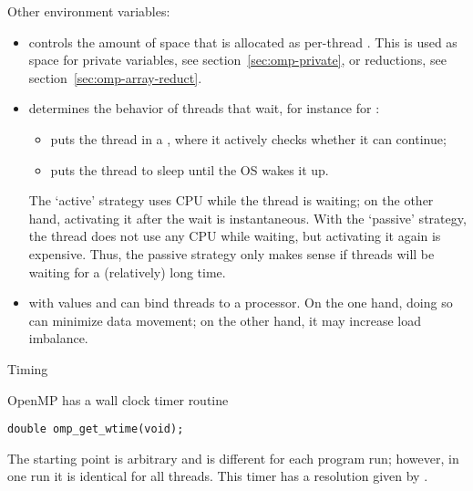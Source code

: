Other environment variables:
\begin{itemize}
\item {} controls the amount of space that is
  allocated as per-thread .
  This is used as space for private variables, see section~\ref{sec:omp-private},
  or reductions, see section~\ref{sec:omp-array-reduct}.
\item {} determines the behavior of
  threads that wait, for instance for :
  \begin{itemize}
  \item {} puts the thread in a , where
    it actively checks whether it can continue;
  \item {} puts the thread to sleep until the \ac{OS} wakes
    it up.
  \end{itemize}
  The `active' strategy uses CPU while the thread is waiting; on the
  other hand, activating it after the wait is instantaneous. With the
  `passive' strategy, the thread does not use any CPU while waiting,
  but activating it again is expensive. Thus, the passive strategy
  only makes sense if threads will be waiting for a (relatively) long
  time.
\item {} with values  and 
  can bind threads to a processor. On the one hand, doing so can
  minimize data movement; on the other hand, it may increase load
  imbalance.
\end{itemize}


 {Timing}
\label{sec:omp-timing}

OpenMP has a wall clock timer routine 
\begin{lstlisting}
double omp_get_wtime(void);
\end{lstlisting}
The starting point is arbitrary and is different for each program run;
however, in one run it is identical for all threads.
This timer has a resolution given by .

